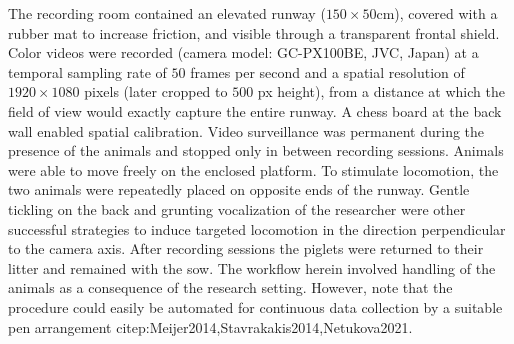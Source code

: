 The recording room contained an elevated runway (\(150 \times 50\)cm), covered with a rubber mat to increase friction, and visible through a transparent frontal shield.
Color videos were recorded (camera model: GC-PX100BE, JVC, Japan) at a temporal sampling rate of \(50\) frames per second and a spatial resolution of \(1920 \times 1080\) pixels (later cropped to \(500\) px height), from a distance at which the field of view would exactly capture the entire runway.
A chess board at the back wall enabled spatial calibration.
Video surveillance was permanent during the presence of the animals and stopped only in between recording sessions.
Animals were able to move freely on the enclosed platform.
To stimulate locomotion, the two animals were repeatedly placed on opposite ends of the runway.
Gentle tickling on the back and grunting vocalization of the researcher were other successful strategies to induce targeted locomotion in the direction perpendicular to the camera axis.
After recording sessions the piglets were returned to their litter and remained with the sow.
The workflow herein involved handling of the animals as a consequence of the research setting.
However, note that the procedure could easily be automated for continuous data collection by a suitable pen arrangement citep:Meijer2014,Stavrakakis2014,Netukova2021.



